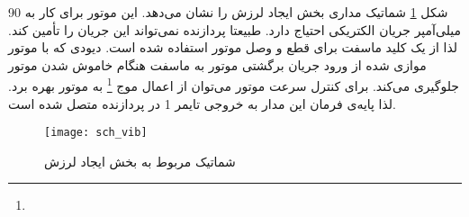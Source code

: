 شکل \ref{fig:sch-vib} شماتیک مداری بخش ایجاد لرزش را نشان می‌دهد. این موتور برای کار به 90 میلی‌آمپر جریان الکتریکی احتیاج دارد. طبیعتا پردازنده نمی‌تواند این جریان را تأمین کند. لذا از یک کلید ماسفت برای قطع و وصل موتور استفاده شده است. دیودی که با موتور موازی شده از ورود جریان برگشتی موتور به ماسفت هنگام خاموش شدن موتور جلوگیری می‌کند. برای کنترل سرعت موتور می‌توان از اعمال موج \footnote{} به موتور بهره برد. لذا پایه‌ی فرمان این مدار به خروجی  تایمر 1 در پردازنده متصل شده است.

\begin{figure}[h]
	\centering
	\texttt{[image: sch\_vib]}
	\caption{شماتیک مربوط به بخش ایجاد لرزش}
	\label{fig:sch-vib}
\end{figure}



